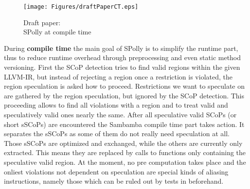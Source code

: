 \begin{figure}
  \centering
  \texttt{[image: Figures/draftPaperCT.eps]}
  \caption{Draft paper: \\SPolly at compile time}
  \vspace*{-5mm}
  \label{fig:draftPaperCT}  
\end{figure}
During \textbf{compile time} the main goal of SPolly is to simplify the runtime part, thus
to reduce runtime overhead through preprocessing and even static method versioning.
First  the SCoP detection tries to find valid regions within the given LLVM-IR, 
but instead of rejecting a region once a restriction is violated, 
the region speculation is asked how to proceed. Restrictions we want to speculate
on are gathered by the region speculation, but ignored by the SCoP detection.
This proceeding allows to find all violations with a region and to treat valid and
speculatively valid ones nearly the same. After all  
speculative valid SCoPs (or short sSCoPs) are encountered the Sambamba compile 
time part takes action. It separates the sSCoPs as some of them do not really 
need speculation at all. Those sSCoPs are optimized and exchanged, 
while the others are currently only extracted. This means they are replaced by
calls to functions only containing the speculative valid region. 
At the moment, no pre computation takes place and the onliest violations 
not dependent on speculation are special kinds of aliasing instructions, 
namely those which can be ruled out by tests in beforehand. 

